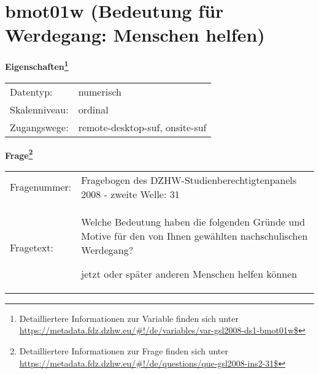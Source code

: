 
    \setcounter{footnote}{0}

    \vspace*{-1.8cm}
	\section{bmot01w (Bedeutung für Werdegang: Menschen helfen)}
	\label{section:bmot01w}



    \vspace*{0.5cm}
    \noindent\textbf{Eigenschaften\footnote{Detailliertere Informationen zur Variable finden sich unter
		\url{https://metadata.fdz.dzhw.eu/\#!/de/variables/var-gsl2008-ds1-bmot01w$}}}\\
	\begin{tabularx}{\hsize}{@{}lX}
	Datentyp: & numerisch \\
	Skalenniveau: & ordinal \\
	Zugangswege: &
	  remote-desktop-suf, 
	  onsite-suf
 \\
    \end{tabularx}



				\vspace*{0.5cm}
                \noindent\textbf{Frage\footnote{Detailliertere Informationen zur Frage finden sich unter
		              \url{https://metadata.fdz.dzhw.eu/\#!/de/questions/que-gsl2008-ins2-31$}}}\\
				\begin{tabularx}{\hsize}{@{}lX}
					Fragenummer: &
					  Fragebogen des DZHW-Studienberechtigtenpanels 2008 - zweite Welle:
					  31
 \\
					Fragetext: & Welche Bedeutung haben die folgenden Gründe und Motive für den von Ihnen gewählten nachschulischen Werdegang?\par  jetzt oder später anderen Menschen helfen können \\
				\end{tabularx}





